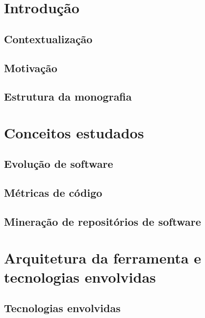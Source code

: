 \documentclass[a4paper, 12pt, twoside]{book}
\begin{document}
\pagestyle{plain}
\setcounter{page}{1} 
\tableofcontents

\newpage

\setcounter{page}{1}

\chapter{Introdução}

    \section{Contextualização}

    \section{Motivação}
    
    \section{Estrutura da monografia}

    
\chapter{Conceitos estudados}

    \section{Evolução de software}
    
    \section{Métricas de código}
    
    \section{Mineração de repositórios de software}

    
\chapter{Arquitetura da ferramenta e tecnologias envolvidas}

    \section{Tecnologias envolvidas}
    
\end{document}
